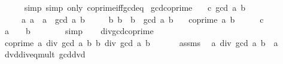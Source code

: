\begin{isabellebody}
\ \ \ \ \isamarkupfalse%
\ simp\ {\isacharparenleft}{\kern0pt}simp\ only{\isacharcolon}{\kern0pt}\ coprime{\isacharunderscore}{\kern0pt}iff{\isacharunderscore}{\kern0pt}gcd{\isacharunderscore}{\kern0pt}eq{\isacharunderscore}{\kern0pt}{}{\isacharparenright}{\kern0pt}\isanewline
{}\isamarkupfalse%
%
\endisatagproof
{\isafoldproof}%
%
\isadelimproof
\isanewline
%
\endisadelimproof
\isanewline
{}\isamarkupfalse%
\ gcd{\isacharunderscore}{\kern0pt}coprime{\isacharcolon}{\kern0pt}\isanewline
\ \ \ c{\isacharcolon}{\kern0pt}\ {\isachardoublequoteopen}gcd\ a\ b\ {\isasymnoteq}\ {}{\isachardoublequoteclose}\isanewline
\ \ \ \ \ a{\isacharcolon}{\kern0pt}\ {\isachardoublequoteopen}a\ {\isacharequal}{\kern0pt}\ a{\isacharprime}{\kern0pt}\ {\isacharasterisk}{\kern0pt}\ gcd\ a\ b{\isachardoublequoteclose}\isanewline
\ \ \ \ \ b{\isacharcolon}{\kern0pt}\ {\isachardoublequoteopen}b\ {\isacharequal}{\kern0pt}\ b{\isacharprime}{\kern0pt}\ {\isacharasterisk}{\kern0pt}\ gcd\ a\ b{\isachardoublequoteclose}\isanewline
\ \ \ {\isachardoublequoteopen}coprime\ a{\isacharprime}{\kern0pt}\ b{\isacharprime}{\kern0pt}{\isachardoublequoteclose}\isanewline
%
\isadelimproof
%
\endisadelimproof
%
\isatagproof
{}\isamarkupfalse%
\ {\isacharminus}{\kern0pt}\isanewline
\ \ \isamarkupfalse%
\ c\ \isamarkupfalse%
\ {\isachardoublequoteopen}a\ {\isasymnoteq}\ {}\ {\isasymor}\ b\ {\isasymnoteq}\ {}{\isachardoublequoteclose}\isanewline
\ \ \ \ \isamarkupfalse%
\ simp\isanewline
\ \ \isamarkupfalse%
\ div{\isacharunderscore}{\kern0pt}gcd{\isacharunderscore}{\kern0pt}coprime\ \isamarkupfalse%
\ {\isachardoublequoteopen}coprime\ {\isacharparenleft}{\kern0pt}a\ div\ gcd\ a\ b{\isacharparenright}{\kern0pt}\ {\isacharparenleft}{\kern0pt}b\ div\ gcd\ a\ b{\isacharparenright}{\kern0pt}{\isachardoublequoteclose}\ \isacommand{{\isachardot}{\kern0pt}}\isamarkupfalse%
\isanewline
\ \ \isamarkupfalse%
\ \isamarkupfalse%
\ assms\ \isamarkupfalse%
\ {\isachardoublequoteopen}a\ div\ gcd\ a\ b\ {\isacharequal}{\kern0pt}\ a{\isacharprime}{\kern0pt}{\isachardoublequoteclose}\isanewline
\ \ \ \ \isamarkupfalse%
\ dvd{\isacharunderscore}{\kern0pt}div{\isacharunderscore}{\kern0pt}eq{\isacharunderscore}{\kern0pt}mult\ gcd{\isacharunderscore}{\kern0pt}dvd{}\ \isamarkupfalse%

\end{isabellebody}
